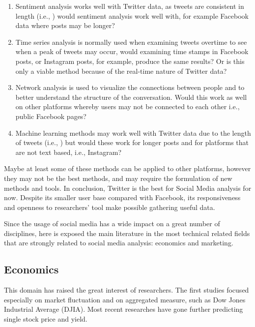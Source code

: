 \documentclass[]{book}
\providecommand{\tightlist}{%
  \setlength{\itemsep}{0pt}\setlength{\parskip}{0pt}}
\begin{document}
\begin{enumerate}
\def\labelenumi{\arabic{enumi}.}
\tightlist
\item
  Sentiment analysis works well with Twitter data, as tweets are
  consistent in length (i.e., ) would sentiment analysis work well with,
  for example Facebook data where posts may be longer?
\item
  Time series analysis is normally used when examining tweets overtime
  to see when a peak of tweets may occur, would examining time stamps in
  Facebook posts, or Instagram posts, for example, produce the same
  results? Or is this only a viable method because of the real-time
  nature of Twitter data?
\item
  Network analysis is used to visualize the connections between people
  and to better understand the structure of the conversation. Would this
  work as well on other platforms whereby users may not be connected to
  each other i.e., public Facebook pages?
\item
  Machine learning methods may work well with Twitter data due to the
  length of tweets (i.e., ) but would these work for longer posts and
  for platforms that are not text based, i.e., Instagram?
\end{enumerate}

Maybe at least some of these methods can be applied to other platforms,
however they may not be the best methods, and may require the
formulation of new methods and tools. In conclusion, Twitter is the best
for Social Media analysis for now. Despite its smaller user base
compared with Facebook, its responsiveness and openness to researchers'
tool make possible gathering useful data.

Since the usage of social media has a wide impact on a great number of
disciplines, here is exposed the main literature in the most technical
related fields that are strongly related to social media analysis:
economics and marketing.

\subsection{Economics}\label{economics}

This domain has raised the great interest of researchers. The first
studies focused especially on market fluctuation and on aggregated
measure, such as Dow Jones Industrial Average (DJIA). Most recent
researches have gone further predicting single stock price and yield.
\end{document}
